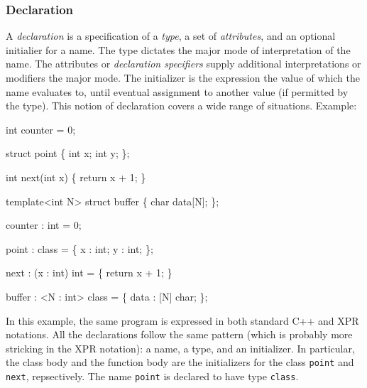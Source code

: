 \documentclass[a4paper,12pt]{article}
\begin{document}
\subsubsection{Declaration}
\label{sec:intro:general-notion:declaration}
A \emph{declaration} is a specification of a \emph{type}, a set of
\emph{attributes}, and an optional initialier for a name.  The type dictates
the major mode of interpretation of the name.  The attributes or
\emph{declaration specifiers} supply additional interpretations or modifiers
the major mode.  The initializer is the expression the value of which the
name evaluates to, until eventual assignment to another value (if permitted by
the type).  This notion of declaration covers a wide range of situations.
Example:

\begin{minipage}[t]{12cm}
  \begin{minipage}[t]{5cm}
    \begin{Program}
  int counter = 0;

  struct point \{
    int x;
    int y;
  \};

  int next(int x) \{
    return x + 1;
  \}

  template<int N>
  struct buffer \{
     char data[N];
  \};
    
    \end{Program}
  \end{minipage}\hfil \vrule \hfil
  \begin{minipage}[t]{5cm}
    \begin{Program}
  counter : int = 0;

  point : class = \{
    x : int;
    y : int;
  \};

  next : (x : int) int = \{
    return x + 1;
  \}

  buffer : <N : int> class = \{
    data : [N] char;
  \};
    \end{Program}
  \end{minipage}
\end{minipage}

In this example, the same program is expressed in both standard C++ and XPR
notations.  All the declarations follow the same pattern (which is probably
more stricking in the XPR notation): a name, a type, and an initializer.  In
particular, the class body and the function body are the initializers for the
class \texttt{point} and \texttt{next}, repsectively.  The name \texttt{point}
is declared to have type \texttt{class}.
 
\end{document}
